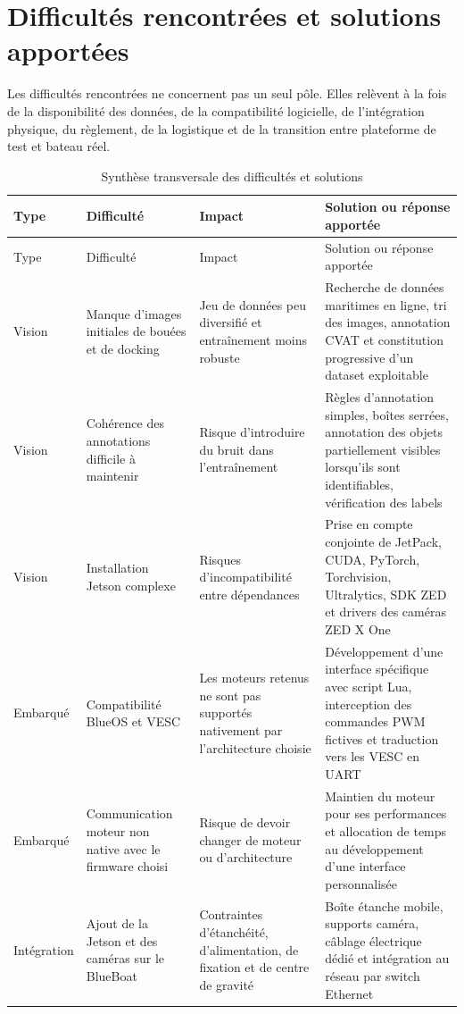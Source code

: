 \documentclass[11pt,letterpaper]{article}
\begin{document}
\section{Difficultés rencontrées et solutions apportées}

Les difficultés rencontrées ne concernent pas un seul pôle. Elles relèvent à la fois de la disponibilité des données, de la compatibilité logicielle, de l'intégration physique, du règlement, de la logistique et de la transition entre plateforme de test et bateau réel.

\begin{longtable}{L{2.5cm}L{3.8cm}L{3.8cm}L{4cm}}
    \caption{Synthèse transversale des difficultés et solutions}\\
    \toprule
    Type & Difficulté & Impact & Solution ou réponse apportée \\
    \midrule
    \endfirsthead
    \toprule
    Type & Difficulté & Impact & Solution ou réponse apportée \\
    \midrule
    \endhead
    Vision & Manque d'images initiales de bouées et de docking & Jeu de données peu diversifié et entraînement moins robuste & Recherche de données maritimes en ligne, tri des images, annotation CVAT et constitution progressive d'un dataset exploitable \\
    Vision & Cohérence des annotations difficile à maintenir & Risque d'introduire du bruit dans l'entraînement & Règles d'annotation simples, boîtes serrées, annotation des objets partiellement visibles lorsqu'ils sont identifiables, vérification des labels \\
    Vision & Installation Jetson complexe & Risques d'incompatibilité entre dépendances & Prise en compte conjointe de JetPack, CUDA, PyTorch, Torchvision, Ultralytics, SDK ZED et drivers des caméras ZED X One \\
    Embarqué & Compatibilité BlueOS et VESC & Les moteurs retenus ne sont pas supportés nativement par l'architecture choisie & Développement d'une interface spécifique avec script Lua, interception des commandes PWM fictives et traduction vers les VESC en UART \\
    Embarqué & Communication moteur non native avec le firmware choisi & Risque de devoir changer de moteur ou d'architecture & Maintien du moteur pour ses performances et allocation de temps au développement d'une interface personnalisée \\
    Intégration & Ajout de la Jetson et des caméras sur le BlueBoat & Contraintes d'étanchéité, d'alimentation, de fixation et de centre de gravité & Boîte étanche mobile, supports caméra, câblage électrique dédié et intégration au réseau par switch Ethernet \\

\end{longtable}
\end{document}
